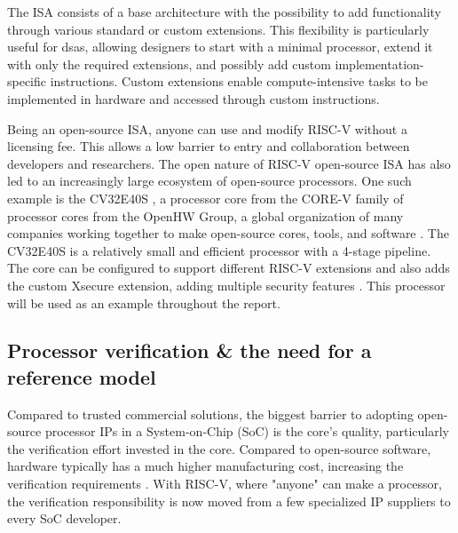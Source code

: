 The ISA consists of a base architecture with the possibility to add functionality through various standard or custom extensions\cite{watermanRISCVInstructionSet2019}. This flexibility is particularly useful for \acrshort{dsa}s, allowing designers to start with a minimal processor, extend it with only the required extensions, and possibly add custom implementation-specific instructions. Custom extensions enable compute-intensive tasks to be implemented in hardware and accessed through custom instructions. 

Being an open-source ISA, anyone can use and modify RISC-V without a licensing fee. This allows a low barrier to entry and collaboration between developers and researchers. The open nature of RISC-V open-source ISA has also led to an increasingly large ecosystem of open-source processors. One such example is the CV32E40S \cite{openhwgroupCv32e40s2024}, a processor core from the CORE-V family of processor cores from the OpenHW Group, a global organization of many companies working together to make open-source cores, tools, and software \cite{taylorAdvancedRISCVVerification2023}. The CV32E40S is a relatively small and efficient processor with a 4-stage pipeline. The core can be configured to support different RISC-V extensions and also adds the custom Xsecure extension, adding multiple security features \cite{openhwgroupIntroductionCOREVCV32E40S2023}. This processor will be used as an example throughout the report.





\subsection{Processor verification \& the need for a reference model}

Compared to trusted commercial solutions, the biggest barrier to adopting open-source processor IPs in a System-on-Chip (SoC) is the core's quality, particularly the verification effort invested in the core. Compared to open-source software, hardware typically has a much higher manufacturing cost, increasing the verification requirements \cite{kevinmcdermottOpenHWIndustrialGradeVerification2022}.
With RISC-V, where "anyone" can make a processor, the verification responsibility is now moved from a few specialized IP suppliers to every SoC developer. 

